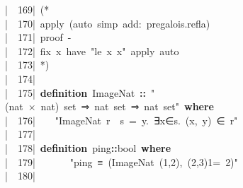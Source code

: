 \documentclass{article}
\newcommand{\syntaxCOMMENTA}[1]{\textcolor[rgb]{0.8,0.0,0.0}{#1}}
\newcommand{\syntaxKEYWORDA}[1]{\textcolor[rgb]{0.0,0.4,0.6}{\textbf{#1}}}
\newcommand{\syntaxKEYWORDB}[1]{\textcolor[rgb]{0.0,0.6,0.4}{\textbf{#1}}}
\newcommand{\syntaxLITERALA}[1]{\textcolor[rgb]{1.0,0.0,0.8}{#1}}
\newcommand{\syntaxOPERATOR}[1]{\textcolor[rgb]{0.0,0.0,0.0}{\textbf{#1}}}
\newcommand{\syntaxCOMMENTA}[1]{\textcolor[rgb]{0.8,0.0,0.0}{#1}}
\newcommand{\syntaxKEYWORDA}[1]{\textcolor[rgb]{0.0,0.4,0.6}{\textbf{#1}}}
\newcommand{\syntaxKEYWORDB}[1]{\textcolor[rgb]{0.0,0.6,0.4}{\textbf{#1}}}
\newcommand{\syntaxLITERALA}[1]{\textcolor[rgb]{1.0,0.0,0.8}{#1}}
\newcommand{\syntaxOPERATOR}[1]{\textcolor[rgb]{0.0,0.0,0.0}{\textbf{#1}}}
\newcommand{\syntaxCOMMENTA}[1]{\textcolor[rgb]{0.8,0.0,0.0}{#1}}
\newcommand{\syntaxKEYWORDA}[1]{\textcolor[rgb]{0.0,0.4,0.6}{\textbf{#1}}}
\newcommand{\syntaxKEYWORDB}[1]{\textcolor[rgb]{0.0,0.6,0.4}{\textbf{#1}}}
\newcommand{\syntaxLITERALA}[1]{\textcolor[rgb]{1.0,0.0,0.8}{#1}}
\newcommand{\syntaxOPERATOR}[1]{\textcolor[rgb]{0.0,0.0,0.0}{\textbf{#1}}}
\newcommand{\syntaxCOMMENTA}[1]{\textcolor[rgb]{0.8,0.0,0.0}{\textbf{#1}}}
\newcommand{\syntaxKEYWORDA}[1]{\textcolor[rgb]{0.0,0.4,0.6}{#1}}
\newcommand{\syntaxKEYWORDB}[1]{\textcolor[rgb]{0.0,0.6,0.4}{#1}}
\newcommand{\syntaxLITERALA}[1]{\textcolor[rgb]{1.0,0.0,0.8}{\textbf{#1}}}
\newcommand{\syntaxOPERATOR}[1]{\textcolor[rgb]{0.0,0.0,0.0}{#1}}
\newcommand{\syntaxCOMMENTA}[1]{\textcolor[rgb]{0.8,0.0,0.0}{#1}}
\newcommand{\syntaxKEYWORDA}[1]{\textcolor[rgb]{0.0,0.4,0.6}{\textbf{#1}}}
\newcommand{\syntaxKEYWORDB}[1]{\textcolor[rgb]{0.0,0.6,0.4}{\textbf{#1}}}
\newcommand{\syntaxLITERALA}[1]{\textcolor[rgb]{1.0,0.0,0.8}{#1}}
\newcommand{\syntaxOPERATOR}[1]{\textcolor[rgb]{0.0,0.0,0.0}{\textbf{#1}}}
\newcommand{\syntaxCOMMENTA}[1]{\textcolor[rgb]{0.8,0.0,0.0}{#1}}
\newcommand{\syntaxKEYWORDA}[1]{\textcolor[rgb]{0.0,0.4,0.6}{\textbf{#1}}}
\newcommand{\syntaxKEYWORDB}[1]{\textcolor[rgb]{0.0,0.6,0.4}{\textbf{#1}}}
\newcommand{\syntaxLITERALA}[1]{\textcolor[rgb]{1.0,0.0,0.8}{#1}}
\newcommand{\syntaxOPERATOR}[1]{\textcolor[rgb]{0.0,0.0,0.0}{\textbf{#1}}}
\newcommand{\syntaxCOMMENTA}[1]{\textcolor[rgb]{0.0,0.0,0.0}{#1}}
\newcommand{\syntaxKEYWORDA}[1]{\textcolor[rgb]{0.0,0.0,0.0}{#1}}
\newcommand{\syntaxKEYWORDB}[1]{\textcolor[rgb]{0.0,0.0,0.0}{#1}}
\newcommand{\gutter}[1]{\textcolor[rgb]{0,0,0}{{|}#1}}
\newcommand{\gutterH}[1]{\textcolor[rgb]{1,0,0}{{|}#1}}
\begin{document}
\gutter{\ \ 169{|}\ }\syntaxCOMMENTA{(*{\ }}\hspace*{\fill}\\
\gutterH{\ \ 170{|}\ }\syntaxCOMMENTA{apply{\ }(auto{\ }simp{\ }add:{\ }pre\usebox{\underscorebox}galois.refla)}\hspace*{\fill}\\
\gutter{\ \ 171{|}\ }\syntaxCOMMENTA{proof{\ }{-}}\hspace*{\fill}\\
\gutter{\ \ 172{|}\ }\syntaxCOMMENTA{fix{\ }x{\ }have{\ }"le{\ }x{\ }x"{\ }apply{\ }auto}\hspace*{\fill}\\
\gutter{\ \ 173{|}\ }\syntaxCOMMENTA{*)}\hspace*{\fill}\\
\gutter{\ \ 174{|}\ }\hspace*{\fill}\\
\gutterH{\ \ 175{|}\ }\syntaxKEYWORDA{definition}{\ }ImageNat{\ }\syntaxOPERATOR{::}{\ }\syntaxLITERALA{"(nat{\ }×{\ }nat){\ }set{\ }⇒{\ }nat{\ }set{\ }⇒{\ }nat{\ }set"}{\ }\syntaxKEYWORDB{where}\hspace*{\fill}\\
\gutter{\ \ 176{|}\ }{\ }{\ }{\ }\syntaxLITERALA{"ImageNat{\ }r{\ }{\ }s{\ }={\ }\usebox{\opencurlybracket}y.{\ }∃x∈s.{\ }(x,{\ }y){\ }∈{\ }r\usebox{\closecurlybracket}"}\hspace*{\fill}\\
\gutter{\ \ 177{|}\ }\hspace*{\fill}\\
\gutter{\ \ 178{|}\ }\syntaxKEYWORDA{definition}{\ }ping\syntaxOPERATOR{::}bool{\ }\syntaxKEYWORDB{where}\hspace*{\fill}\\
\gutter{\ \ 179{|}\ }{\ }{\ }{\ }{\ }{\ }{\ }\syntaxLITERALA{"ping{\ }≡{\ }(ImageNat{\ }\usebox{\opencurlybracket}(1,2),{\ }(2,3)\usebox{\closecurlybracket}{\ }{\ }\usebox{\opencurlybracket}1\usebox{\closecurlybracket}{\ }={\ }\usebox{\opencurlybracket}2\usebox{\closecurlybracket})"}\hspace*{\fill}\\
\gutterH{\ \ 180{|}\ }\hspace*{\fill}\\
\end{document}
